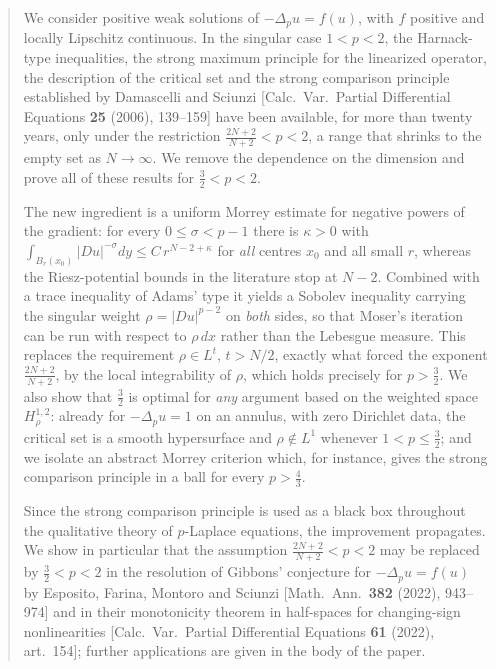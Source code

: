 \documentclass[reqno]{amsart}
\theoremstyle{plain}
\theoremstyle{definition}
\theoremstyle{remark}
\begin{document}
\begin{abstract}
We consider positive weak solutions of $-\Delta_p u=f(u)$, with $f$ positive and locally Lipschitz
continuous. In the singular case $1<p<2$, the Harnack-type inequalities, the strong maximum
principle for the linearized operator, the description of the critical set and the strong comparison
principle established by Damascelli and Sciunzi [Calc.\ Var.\ Partial Differential Equations
\textbf{25} (2006), 139--159] have been available, for more than twenty years, only under the
restriction $\frac{2N+2}{N+2}<p<2$, a range that shrinks to the empty set as $N\to\infty$. We remove
the dependence on the dimension and prove all of these results for $\frac32<p<2$.

The new ingredient is a uniform Morrey estimate for negative powers of the gradient: for every
$0\le\sigma<p-1$ there is $\kappa>0$ with
$\int_{B_r(x_0)}|Du|^{-\sigma}dy\le C\,r^{N-2+\kappa}$ for \emph{all} centres $x_0$ and all small
$r$, whereas the Riesz-potential bounds in the literature stop at $N-2$.
Combined with a trace inequality of Adams' type it yields a Sobolev inequality carrying the singular
weight $\rho=|Du|^{p-2}$ on \emph{both} sides, so that Moser's iteration can be run with respect to
$\rho\,dx$ rather than the Lebesgue measure. This replaces the requirement $\rho\in L^{t}$, $t>N/2$,
exactly what forced the exponent $\frac{2N+2}{N+2}$, by the local integrability of $\rho$, which
holds precisely for $p>\frac32$. We also show that $\frac32$ is optimal for
\emph{any} argument based on the weighted space $H^{1,2}_{\rho}$: already for $-\Delta_pu=1$ on an
annulus, with zero Dirichlet data, the critical set is a smooth hypersurface and $\rho\notin L^1$
whenever $1<p\le\frac32$; and we isolate an abstract Morrey criterion which, for instance,
gives the strong comparison principle in a ball for every $p>\frac43$.

Since the strong comparison principle is used as a black box throughout the qualitative theory of
$p$-Laplace equations, the improvement propagates. We show in particular that the assumption $\frac{2N+2}{N+2}<p<2$ may
be replaced by $\frac32<p<2$ in the resolution of Gibbons' conjecture for $-\Delta_pu=f(u)$ by
Esposito, Farina, Montoro and Sciunzi [Math.\ Ann.\ \textbf{382} (2022), 943--974] and in their
monotonicity theorem in half-spaces for changing-sign nonlinearities [Calc.\ Var.\ Partial
Differential Equations \textbf{61} (2022), art.\ 154]; further applications are given in the body of
the paper.
\end{abstract}
\maketitle
\end{document}
